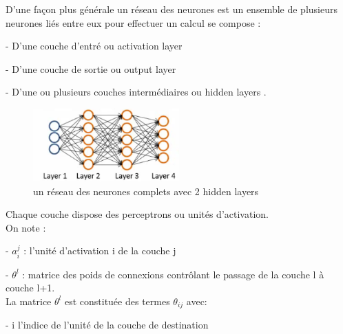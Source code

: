 D'une façon plus générale un  réseau des neurones est un ensemble de plusieurs neurones liés entre eux pour effectuer un calcul se compose :

- D'une couche d'entré ou activation layer 

- D'une couche de sortie ou output layer  

- D'une ou plusieurs couches intermédiaires ou hidden layers .

\begin{figure}[ht]
	\centering
	\includegraphics[width=0.5\textwidth]{fig/FullNeural.png}
	\caption{un réseau des neurones complets avec 2 hidden layers }
	\label{fig:image11}
\end{figure}

Chaque couche dispose des perceptrons ou unités d'activation.\\
On note :

 - ${a}_{i}^{j}$ : l'unité d'activation i de la couche j
 
 
 - ${\theta}^{l}$ : matrice des poids de connexions contrôlant le passage de la couche l à couche l+1.\\
 La matrice ${\theta}^{l}$ est constituée des termes ${\theta}_{ij}$ avec:
 
 - i l'indice de l'unité de la couche de destination
 
